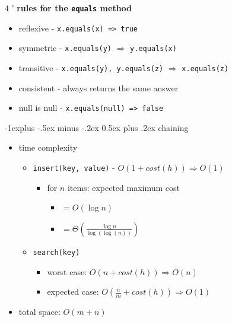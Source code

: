 \documentclass[10pt, landscape]{article}
\makeatletter
\renewcommand{\subsection}{\@startsection{subsection}{2}{0mm}%
                                {-1explus -.5ex minus -.2ex}%
                                {0.5ex plus .2ex}%
                                {\normalfont\normalsize\bfseries}}
\let\Then\Rightarrow
\newcommand{\code}[1]{\textcolor{myblue}{\texttt{#1}}}
\makeatother
\begin{document}
\begin{multicols}{4
    '}
\textbf{rules for the \code{equals} method}
\begin{itemize}
    \item reflexive - \code{x.equals(x) => true}
    \item symmetric - \code{x.equals(y)} $\Then$ \code{y.equals(x)}
    \item transitive - \code{x.equals(y), y.equals(z)} $\Then$ \code{x.equals(z)}
    \item consistent - always returns the same answer
    \item null is null - \code{x.equals(null) => false}
\end{itemize}

\subsection{chaining}
\begin{itemize}
    \item time complexity
    \begin{itemize}
        \item \code{insert(key, value)} - $O(1 + cost(h)) \Then O(1)$
        \begin{itemize}
            \item for $n$ items: expected maximum cost 
            \begin{itemize}
                \item $= O(\log n)$
                \item $= \Theta(\frac{\log n}{\log(\log(n))})$
            \end{itemize}
        \end{itemize}
        \item \code{search(key)} 
        \begin{itemize}
            \item worst case: $O(n + cost(h)) \Then O(n)$
            \item expected case: $O(\frac{n}{m} + cost(h)) \Then O(1)$
        \end{itemize}
    \end{itemize}
    \item total space: $O(m + n)$
\end{itemize}


\end{multicols}
\end{document}
